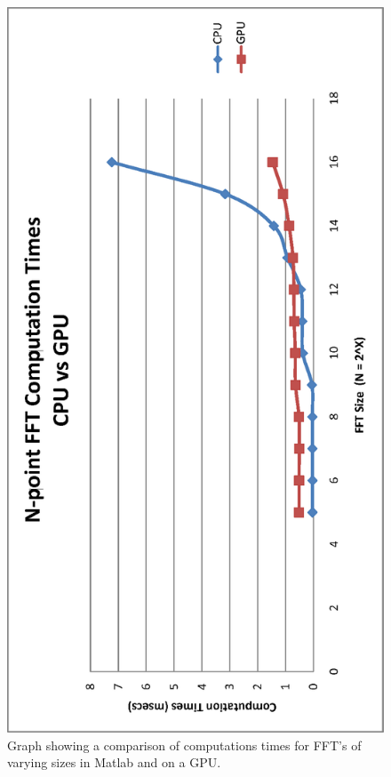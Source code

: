 \begin{figure}[ht]
\begin{center}
 \includegraphics[angle=270,scale=0.6]{images/gpu_images/matlab_vs_cuda_fft_timings.eps}
\end{center}
\caption{Graph showing a comparison of computations times for FFT's of varying sizes in Matlab and on a GPU.}
\label{fig:matlab_vs_gpu_fft_timings}
\end{figure}


